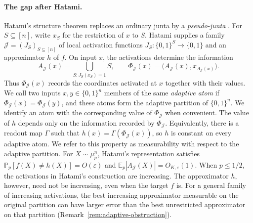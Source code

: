\documentclass[11pt,letterpaper]{article}
\theoremstyle{definition}
\theoremstyle{remark}
\newcommand{\bits}{\{0,1\}}
\newcommand{\E}{\mathbb E}
\renewcommand{\Pr}{\mathbb P}
\newcommand{\cJ}{\mathcal J}
\begin{document}
\paragraph{The gap after Hatami.}
Hatami's structure theorem replaces an ordinary junta by a
\emph{pseudo-junta} \cite{Hatami2012}.  For $S\subseteq[n]$, write $x_S$ for
the restriction of $x$ to $S$.  Hatami supplies a family
$\cJ=(J_S)_{S\subseteq[n]}$ of local activation functions
$J_S:\bits^S\to\bits$ and an approximator $h$ of $f$.  On input $x$, the
activations determine the information
\begin{equation}
\label{eq:intro-adaptive-map}
  A_{\cJ}(x)=\bigcup_{S:J_S(x_S)=1}S,
  \qquad
  \Phi_{\cJ}(x)=\bigl(A_{\cJ}(x),x_{A_{\cJ}(x)}\bigr).
\end{equation}
Thus $\Phi_{\cJ}(x)$ records the coordinates activated at $x$ together with
their values.  We call two inputs $x,y\in\bits^n$ members of the same
\emph{adaptive atom} if $\Phi_{\cJ}(x)=\Phi_{\cJ}(y)$, and these atoms form the
adaptive partition of $\bits^n$.  We identify an atom with the corresponding
value of $\Phi_{\cJ}$ when convenient.  The value of $h$ depends only on the
information recorded by $\Phi_{\cJ}$.  Equivalently, there is a readout map
$\Gamma$ such that $h(x)=\Gamma(\Phi_{\cJ}(x))$, so $h$ is constant on every
adaptive atom.  We refer to this property as measurability with respect to the
adaptive partition.  For $X\sim\mu_p^n$, Hatami's representation satisfies
$\Pr_p[f(X)\ne h(X)]=O(\varepsilon)$ and
$\E_p|A_{\cJ}(X)|=O_{K,\varepsilon}(1)$.  When $p\le1/2$, the activations in
Hatami's construction are increasing.  The approximator $h$, however, need
not be increasing, even when the target $f$ is.  For a general family of
increasing activations, the best increasing approximator measurable on the
original partition can have larger error than the best unrestricted
approximator on that partition (Remark~\ref{rem:adaptive-obstruction}).
\end{document}
